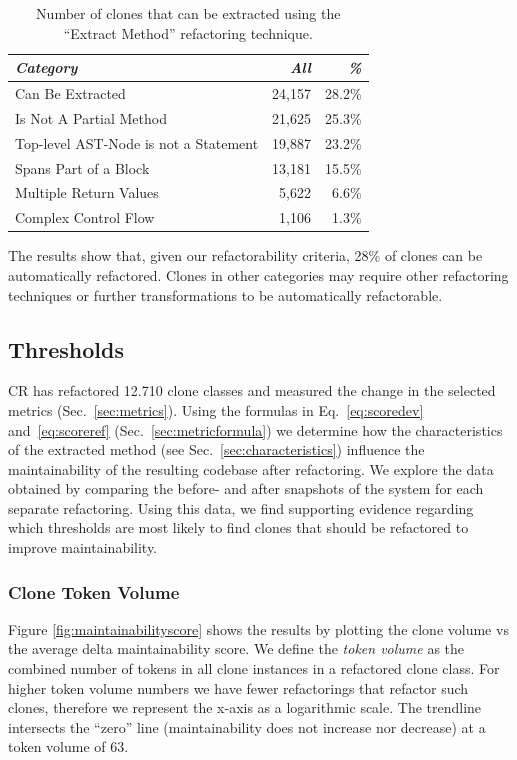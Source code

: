 \documentclass[a4paper,UKenglish,cleveref, autoref, thm-restate,authorcolumns]{lipics-v2019}
\begin{document}
\begin{table}[H]
\centering
\begin{tabular}{@{}lrr@{}}
\toprule
\textit{\textbf{Category}} & \textit{\textbf{All}} & \textit{\textbf{\%}} \\ \midrule
Can Be Extracted & 24,157 & 28.2\%  \\
Is Not A Partial Method & 21,625 & 25.3\% \\
Top-level AST-Node is not a Statement & 19,887 & 23.2\% \\
Spans Part of a Block & 13,181 & 15.5\%  \\
Multiple Return Values & 5,622 & 6.6\%  \\
Complex Control Flow & 1,106 & 1.3\% \\
\end{tabular}
\caption{Number of clones that can be extracted using the ``Extract Method'' refactoring technique.}
\label{tab:refactorability}
\end{table}

The results show that, given our refactorability criteria, 28\% of clones can be automatically refactored. Clones in other categories may require other refactoring techniques or further transformations to be automatically refactorable.

\subsection{Thresholds}
CR has refactored 12.710 clone classes and measured the change in the selected metrics (Sec.~\ref{sec:metrics}). %
Using the formulas in Eq.~\ref{eq:scoredev} and~\ref{eq:scoreref} (Sec.~\ref{sec:metricformula}) we determine how the characteristics of the extracted method (see Sec.~\ref{sec:characteristics}) influence the maintainability of the resulting codebase after refactoring. We explore the data obtained by comparing the before- and after snapshots of the system for each separate refactoring. Using this data, we find supporting evidence regarding which thresholds are most likely to find clones that should be refactored to improve maintainability.

\subsubsection{Clone Token Volume} \label{sec:clonetokenvolume}
Figure \ref{fig:maintainabilityscore} shows the results by plotting the clone volume vs the average delta maintainability score. We define the \textit{token volume} as the combined number of tokens in all clone instances in a refactored clone class. For higher token volume numbers we have fewer refactorings that refactor such clones, therefore we represent the x-axis as a logarithmic scale. The trendline intersects the ``zero'' line (maintainability does not increase nor decrease) at a token volume of 63.
\end{document}
